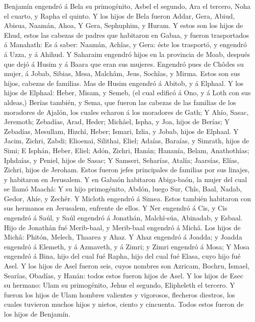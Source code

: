  Benjamín engendró á Bela su primogénito, Asbel el
segundo, Ara el tercero,  Noha el cuarto, y Rapha el
quinto.  Y los hijos de Bela fueron Addar, Gera, Abiud,
 Abisua, Naamán, Ahoa,  Y Gera, Sephuphim, y
Huram.  Y estos son los hijos de Ehud, estos las cabezas
de padres que habitaron en Gabaa, y fueron trasportados á Manahath:
 Es á saber: Naamán, Achîas, y Gera: éste los trasportó, y
engendró á Uzza, y á Ahihud.  Y Saharaim engendró hijos en
la provincia de Moab, después que dejó á Husim y á Baara que eran sus
mujeres.  Engendró pues de Chôdes su mujer, á Jobab,
Sibias, Mesa, Malchâm,  Jeus, Sochîas, y Mirma. Estos son
sus hijos, cabezas de familias.  Mas de Husim engendró á
Abitob, y á Elphaal.  Y los hijos de Elphaal: Heber,
Misam, y Semeb, (el cual edificó á Ono, y á Loth con sus aldeas,)
 Berías también, y Sema, que fueron las cabezas de las
familias de los moradores de Ajalón, los cuales echaron á los moradores
de Gath;  Y Ahío, Sasac, Jeremoth; 
Zebadías, Arad, Heder;  Michâel, Ispha, y Joa, hijos de
Berías;  Y Zebadías, Mesullam, Hizchî, Heber;
 Ismari, Izlia, y Jobab, hijos de Elphaal.
 Y Jacim, Zichri, Zabdi;  Elioenai,
Silithai, Eliel;  Adaías, Baraías, y Simrath, hijos de
Simi;  E Isphán, Heber, Eliel;  Adón,
Zichri, Hanán;  Hananía, Belam, Anathothías;
 Iphdaías, y Peniel, hijos de Sasac;  Y
Samseri, Seharías, Atalía;  Jaarsías, Elías, Zichri,
hijos de Jeroham.  Estos fueron jefes principales de
familias por sus linajes, y habitaron en Jerusalem.  Y en
Gabaón habitaron Abiga-baón, la mujer del cual se llamó Maachâ:
 Y su hijo primogénito, Abdón, luego Sur, Chîs, Baal,
Nadab,  Gedor, Ahíe, y Zechêr.  Y Micloth
engendró á Simea. Estos también habitaron con sus hermanos en Jerusalem,
enfrente de ellos.  Y Ner engendró á Cis, y Cis engendró
á Saúl, y Saúl engendró á Jonathán, Malchî-súa, Abinadab, y Esbaal.
 Hijo de Jonathán fué Merib-baal, y Merib-baal engendró á
Michâ.  Los hijos de Michâ: Phitón, Melech, Thaarea y
Ahaz.  Y Ahaz engendró á Joadda; y Joadda engendró á
Elemeth, y á Azmaveth, y á Zimri; y Zimri engendró á Mosa;
 Y Mosa engendró á Bina, hijo del cual fué Rapha, hijo
del cual fué Elasa, cuyo hijo fué Asel.  Y los hijos de
Asel fueron seis, cuyos nombres son Azricam, Bochru, Ismael, Searías,
Obadías, y Hanán: todos estos fueron hijos de Asel.  Y
los hijos de Esec su hermano: Ulam su primogénito, Jehus el segundo,
Elipheleth el tercero.  Y fueron los hijos de Ulam
hombres valientes y vigorosos, flecheros diestros, los cuales tuvieron
muchos hijos y nietos, ciento y cincuenta. Todos estos fueron de los
hijos de Benjamín.

